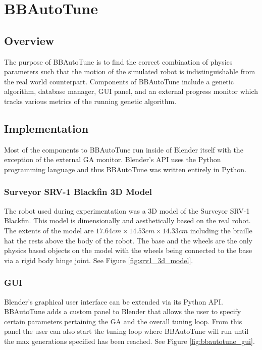 \chapter{BBAutoTune}

\label{Chapter4}

\section{Overview}

The purpose of BBAutoTune is to find the correct combination of physics parameters such that the motion of the simulated robot is indistinguishable from the real world counterpart. Components of BBAutoTune include a genetic algorithm, database manager, GUI panel, and an external progress monitor which tracks various metrics of the running genetic algorithm.  

\section{Implementation}

Most of the components to BBAutoTune run inside of Blender itself with the exception of the external GA monitor. Blender's API uses the Python programming language and thus BBAutoTune was written entirely in Python. 

\subsection{Surveyor SRV-1 Blackfin 3D Model}

The robot used during experimentation was a 3D model of the Surveyor SRV-1 Blackfin. This model is dimensionally and aesthetically based on the real robot. The extents of the model are $17.64cm\times14.53cm\times14.33cm$ including the braille hat the rests above the body of the robot. The base and the wheels are the only physics based objects on the model with the wheels being connected to the base via a rigid body hinge joint. See Figure \ref{fig:srv1_3d_model}.

\subsection{GUI}

Blender's graphical user interface can be extended via its Python API. BBAutoTune adds a custom panel to Blender that allows the user to specify certain parameters pertaining the GA and the overall tuning loop. From this panel the user can also start the tuning loop where BBAutoTune will run until the max generations specified has been reached. See Figure \ref{fig:bbautotune_gui}. 

